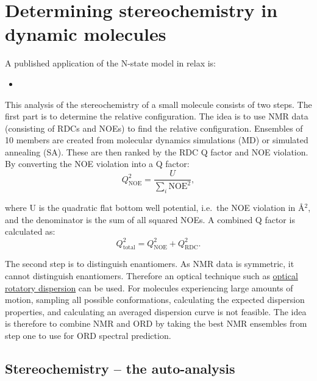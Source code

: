 
\section{Determining stereochemistry in dynamic molecules}

A published application of the N-state model in relax is:
\begin{itemize}
  \item {}
\end{itemize}

This analysis of the stereochemistry of a small molecule consists of two steps.
The first part is to determine the relative configuration.
The idea is to use NMR data (consisting of RDCs and NOEs) to find the relative configuration.
Ensembles of 10 members are created from molecular dynamics simulations (MD) or simulated annealing (SA).
These are then ranked by the RDC Q factor and NOE violation.
By converting the NOE violation into a Q factor:
\begin{equation}
    Q_{\textrm{NOE}}^2 = \frac{U}{\sum_i \textrm{NOE}^2},
\end{equation}

where U is the quadratic flat bottom well potential, i.e.\ the NOE violation in \AA$^2$, and the denominator is the sum of all squared NOEs.
A combined Q factor is calculated as:
\begin{equation}
    Q_{\textrm{total}}^2 = Q_{\textrm{NOE}}^2 + Q_{\textrm{RDC}}^2.
\end{equation}

The second step is to distinguish enantiomers.
As NMR data is symmetric, it cannot distinguish enantiomers.
Therefore an optical technique such as \href{http://en.wikipedia.org/wiki/Optical\_rotatory\_dispersion}{optical rotatory dispersion} can be used.
For molecules experiencing large amounts of motion, sampling all possible conformations, calculating the expected dispersion properties, and calculating an averaged dispersion curve is not feasible.
The idea is therefore to combine NMR and ORD by taking the best NMR ensembles from step one to use for ORD spectral prediction.



\subsection{Stereochemistry -- the auto-analysis}


